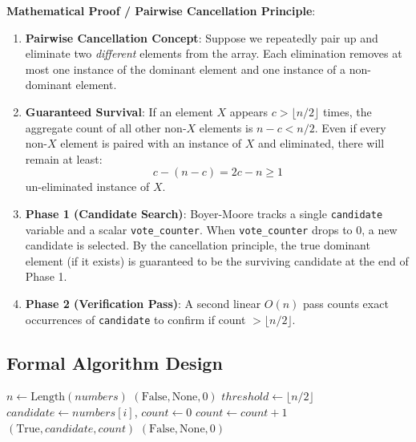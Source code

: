 \textbf{Mathematical Proof / Pairwise Cancellation Principle}:
\begin{enumerate}
    \item \textbf{Pairwise Cancellation Concept}: Suppose we repeatedly pair up and eliminate two \emph{different} elements from the array. Each elimination removes at most one instance of the dominant element and one instance of a non-dominant element.
    \item \textbf{Guaranteed Survival}: If an element $X$ appears $c > \lfloor n / 2 \rfloor$ times, the aggregate count of all other non-$X$ elements is $n - c < n/2$. Even if every non-$X$ element is paired with an instance of $X$ and eliminated, there will remain at least:
    \[
    c - (n - c) = 2c - n \ge 1
    \]
    un-eliminated instance of $X$.
    \item \textbf{Phase 1 (Candidate Search)}: Boyer-Moore tracks a single \texttt{candidate} variable and a scalar \texttt{vote\_counter}. When \texttt{vote\_counter} drops to 0, a new candidate is selected. By the cancellation principle, the true dominant element (if it exists) is guaranteed to be the surviving candidate at the end of Phase 1.
    \item \textbf{Phase 2 (Verification Pass)}: A second linear $O(n)$ pass counts exact occurrences of \texttt{candidate} to confirm if count $> \lfloor n / 2 \rfloor$.
\end{enumerate}

\subsection{Formal Algorithm Design}

\begin{algorithm}[H]
\caption{Solution 1: Brute Force Repeated Counting ($O(n^2)$ Time)}
\begin{algorithmic}[1]
    \State $n \gets \text{Length}(numbers)$
     \Return $(\text{False}, \text{None}, 0)$ \EndIf
    \State $threshold \gets \lfloor n / 2 \rfloor$
        \State $candidate \gets numbers[i]$, $count \gets 0$
                \State $count \gets count + 1$
            \EndIf
        \EndFor
            \State \Return $(\text{True}, candidate, count)$
        \EndIf
    \EndFor
    \State \Return $(\text{False}, \text{None}, 0)$
\EndFunction
\end{algorithmic}
\end{algorithm}


